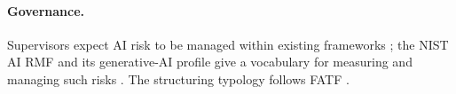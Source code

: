 \paragraph{Governance.} Supervisors expect AI risk to be managed within existing frameworks
\citep{crisanto2024regulating, mas2025airm}; the NIST AI RMF and its generative-AI profile give a vocabulary
for measuring and managing such risks \citep{nist2023airmf, nist2024genai}. The structuring typology follows
FATF \citep{fatf2018pml, fatf2026recommendations}.

